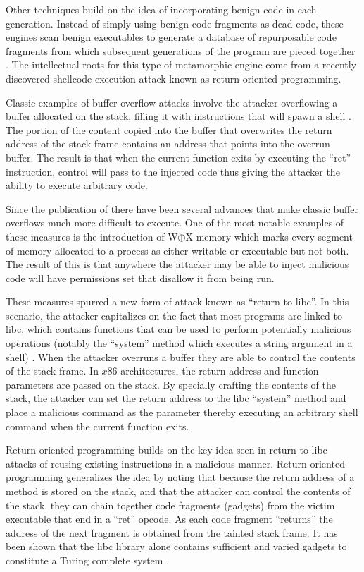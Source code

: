     Other techniques build on the idea of incorporating benign code in each
    generation. Instead of simply using benign code fragments as dead code,
    these engines scan benign executables to generate a database of repurposable
    code fragments from which subsequent generations of the program are pieced
    together \cite{franken}. The intellectual roots for this type of metamorphic
    engine come from a recently discovered shellcode execution attack known as
    return-oriented programming.

    Classic examples of buffer overflow attacks involve the attacker overflowing
    a buffer allocated on the stack, filling it with instructions that will
    spawn a shell \cite{aleph}. The portion of the content copied into the
    buffer that overwrites the return address of the stack frame contains an
    address that points into the overrun buffer. The result is that when the
    current function exits by executing the ``ret'' instruction, control will
    pass to the injected code thus giving the attacker the ability to execute
    arbitrary code.

    Since the publication of \cite{aleph} there have been several advances that
    make classic buffer overflows much more difficult to execute. One of the
    most notable examples of these measures is the introduction of W$\oplus$X
    memory which marks every segment of memory allocated to a process as either
    writable or executable but not both. The result of this is that anywhere the
    attacker may be able to inject malicious code will have permissions set that
    disallow it from being run.

    These measures spurred a new form of attack known as ``return to libc''. In
    this scenario, the attacker capitalizes on the fact that most programs are
    linked to libc, which contains functions that can be used to perform
    potentially malicious operations (notably the ``system'' method which
    executes a string argument in a shell) \cite{rop_gep}. When the attacker
    overruns a buffer they are able to control the contents of the stack frame.
    In $x86$ architectures, the return address and function parameters are
    passed on the stack. By specially crafting the contents of the stack, the
    attacker can set the return address to the libc ``system'' method and place
    a malicious command as the parameter thereby executing an arbitrary shell
    command when the current function exits.

    Return oriented programming builds on the key idea seen in return to libc
    attacks of reusing existing instructions in a malicious manner. Return
    oriented programming generalizes the idea by noting that because the return
    address of a method is stored on the stack, and that the attacker can
    control the contents of the stack, they can chain together code fragments
    (gadgets) from the victim executable that end in a ``ret'' opcode. As each
    code fragment ``returns'' the address of the next fragment is obtained from
    the tainted stack frame. It has been shown that the libc library alone
    contains sufficient and varied gadgets to constitute a Turing complete
    system \cite{rop_geo}.

